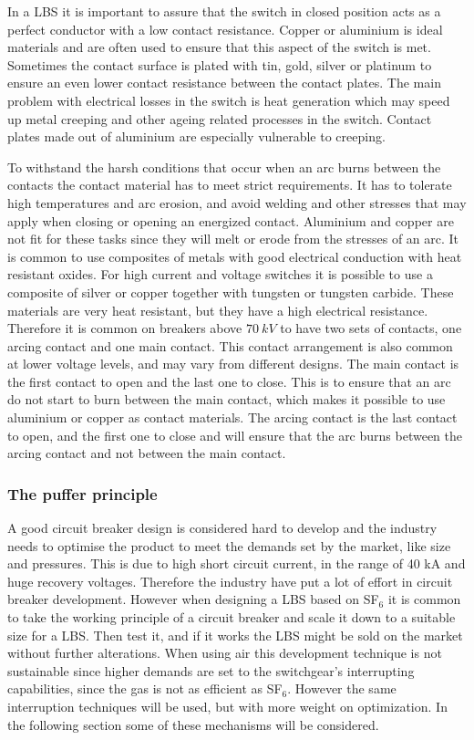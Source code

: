 \documentclass[10pt,a4paper,twoside]{article}
\begin{document}
In a LBS it is important to assure that the switch in closed position acts as a perfect conductor with a low contact resistance. Copper or aluminium is ideal materials and are often used to ensure that this aspect of the switch is met. Sometimes the contact surface is plated with tin, gold, silver or platinum to ensure an even lower contact resistance between the contact plates. The main problem with electrical losses in the switch is heat generation which may speed up metal creeping and other ageing related processes in the switch. Contact plates made out of aluminium are especially vulnerable to creeping.
 
To withstand the harsh conditions that occur when an arc burns between the contacts the contact material has to meet strict requirements. It has to tolerate high temperatures and arc erosion, and avoid welding and other stresses that may apply when closing or opening an energized contact. Aluminium and copper are not fit for these tasks since they will melt or erode from the stresses of an arc. It is common to use composites of metals with good electrical conduction with heat resistant oxides. For high current and voltage switches it is possible to use a composite of silver or copper together with tungsten or tungsten carbide. These materials are very heat resistant, but they have a high electrical resistance. Therefore it is common on breakers above $70 \ kV$ to have two sets of contacts, one arcing contact and one main contact. This contact arrangement is  also common at lower voltage levels, and may vary from different designs. The main contact is the first contact to open and the last one to close. This is to ensure that an arc do not start to burn between the main contact, which makes it possible to use aluminium or copper as contact materials. The arcing contact is the last contact to open, and the first one to close and will ensure that the arc burns between the arcing contact and not between the main contact.

\subsubsection{The puffer principle}
A good circuit breaker design is considered hard to develop and the industry needs to optimise the product to meet the demands set by the market, like size and pressures. This is due to high short circuit current, in the range of 40 kA and huge recovery voltages. Therefore the industry have put a lot of effort in circuit breaker development. However when designing a LBS based on SF$_6$ it is common to take the working principle of a circuit breaker and scale it down to a suitable size for a LBS. Then test it, and if it works the LBS might be sold on the market without further alterations. When using air this development technique is not sustainable since higher demands are set to the switchgear's interrupting capabilities, since the gas is not as efficient as SF$_6$. However the same interruption techniques will be used, but with more weight on optimization. In the following section some of these mechanisms will be considered. 
\end{document}
